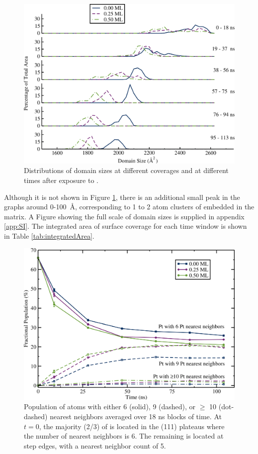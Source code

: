 \begin{figure}[p!]
\includegraphics[width=\linewidth]{../figures/chap3/domains_Pt_110ns.pdf}
\caption{Distributions of  domain sizes at different 
  coverages and at different times after exposure to .}
\label{fig:domainAreasPt}
\end{figure}

Although it is not shown in Figure \ref{fig:domainAreasPt}, there is
an additional small peak in the  graphs around 0-100~\AA,
corresponding to 1 to 2 atom clusters of  embedded in the
 matrix.  A Figure showing the full scale of domain sizes is
supplied in appendix \ref{app:SI}.  The integrated area of
surface coverage for each time window is shown in Table
\ref{tab:integratedArea}.

\begin{figure}[p!]
  \includegraphics[width=\linewidth]{../figures/chap3/nn.pdf}
  \caption{Population of  atoms with either 6 (solid), 9
    (dashed), or $\ge$ 10 (dot-dashed)  nearest neighbors
    averaged over 18 ns blocks of time.  At $t=0$, the majority
    (2/3) of  is located in the (111) plateaus where
    the number of  nearest neighbors is 6. The remaining
     is located at step edges, with a nearest neighbor 
    count of 5.} 
\label{fig:nearestNeighbors}
\end{figure}

